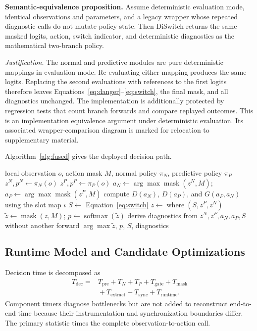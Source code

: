 \documentclass[drones,article,submit,moreauthors]{Definitions/mdpi}
\newcommand{\DS}{DiSwitch}\newcommand{\FastDS}{Fast-DiSwitch}
\begin{document}
\textbf{Semantic-equivalence proposition.} Assume deterministic evaluation mode, identical observations and parameters, and a legacy wrapper whose repeated diagnostic calls do not mutate policy state. Then \DS{} returns the same masked logits, action, switch indicator, and deterministic diagnostics as the mathematical two-branch policy.

\textit{Justification.} The normal and predictive modules are pure deterministic mappings in evaluation mode. Re-evaluating either mapping produces the same logits. Replacing the second evaluations with references to the first logits therefore leaves Equations~\eqref{eq:danger}--\eqref{eq:switch}, the final mask, and all diagnostics unchanged. The implementation is additionally protected by regression tests that count branch forwards and compare replayed outcomes. This is an implementation equivalence argument under deterministic evaluation. Its associated wrapper-comparison diagram is marked for relocation to supplementary material.

Algorithm~\ref{alg:fused} gives the deployed decision path.

\begin{algorithm}[H]
\caption{DiSwitch decision}\label{alg:fused}
\begin{algorithmic}[1]
\Require local observation $o$, action mask $M$, normal policy $\pi_N$, predictive policy $\pi_P$
\State $z^N,p^N\gets\pi_N(o)$ 
\State $z^P,p^P\gets\pi_P(o)$ 
\State $a_N\gets\arg\max \operatorname{mask}(z^N,M)$; $a_P\gets\arg\max \operatorname{mask}(z^P,M)$
\State compute $D(a_N)$, $D(a_P)$, and $G(a_P,a_N)$ using the slot map $\iota$
\State $S\gets$ Equation~\eqref{eq:switch}
\State $z\gets\operatorname{where}(S,z^P,z^N)$
\State $\tilde z\gets\operatorname{mask}(z,M)$; $p\gets\operatorname{softmax}(\tilde z)$
\State derive diagnostics from $z^N,z^P,a_N,a_P,S$ without another forward
\State \Return $\arg\max\tilde z$, $p$, $S$, diagnostics
\end{algorithmic}
\end{algorithm}

\subsection{Runtime Model and Candidate Optimizations}

Decision time is decomposed as
\begin{equation}
\begin{aligned}
T_{\mathrm{dec}}={}&T_{\mathrm{pre}}+T_N+T_P+T_{\mathrm{gate}}+T_{\mathrm{mask}}\\
&{}+T_{\mathrm{extract}}+T_{\mathrm{sync}}+T_{\mathrm{runtime}}.
\end{aligned}
\end{equation}
Component timers diagnose bottlenecks but are not added to reconstruct end-to-end time because their instrumentation and synchronization boundaries differ. The primary statistic times the complete observation-to-action call.
\end{document}
